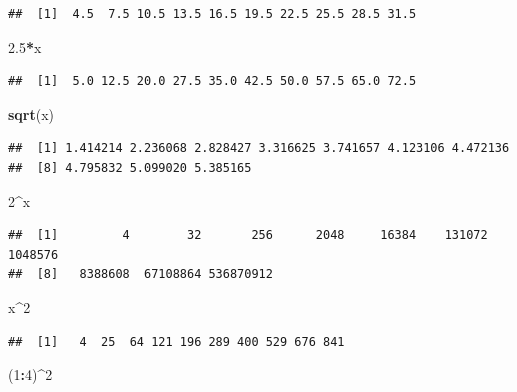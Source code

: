 \documentclass[]{book}
\newenvironment{Shaded}{\begin{snugshade}}{\end{snugshade}}
\newcommand{\DecValTok}[1]{\textcolor[rgb]{0.00,0.00,0.81}{#1}}
\newcommand{\FloatTok}[1]{\textcolor[rgb]{0.00,0.00,0.81}{#1}}
\newcommand{\KeywordTok}[1]{\textcolor[rgb]{0.13,0.29,0.53}{\textbf{#1}}}
\newcommand{\NormalTok}[1]{#1}
\newcommand{\OperatorTok}[1]{\textcolor[rgb]{0.81,0.36,0.00}{\textbf{#1}}}
\theoremstyle{definition}
\theoremstyle{definition}
\theoremstyle{definition}
\theoremstyle{remark}
\begin{document}
\begin{verbatim}
##  [1]  4.5  7.5 10.5 13.5 16.5 19.5 22.5 25.5 28.5 31.5
\end{verbatim}

\begin{Shaded}
\begin{Highlighting}[]
\FloatTok{2.5}\OperatorTok{*}\NormalTok{x}
\end{Highlighting}
\end{Shaded}

\begin{verbatim}
##  [1]  5.0 12.5 20.0 27.5 35.0 42.5 50.0 57.5 65.0 72.5
\end{verbatim}

\begin{Shaded}
\begin{Highlighting}[]
\KeywordTok{sqrt}\NormalTok{(x) }
\end{Highlighting}
\end{Shaded}

\begin{verbatim}
##  [1] 1.414214 2.236068 2.828427 3.316625 3.741657 4.123106 4.472136
##  [8] 4.795832 5.099020 5.385165
\end{verbatim}

\begin{Shaded}
\begin{Highlighting}[]
\DecValTok{2}\OperatorTok{^}\NormalTok{x}
\end{Highlighting}
\end{Shaded}

\begin{verbatim}
##  [1]         4        32       256      2048     16384    131072   1048576
##  [8]   8388608  67108864 536870912
\end{verbatim}

\begin{Shaded}
\begin{Highlighting}[]
\NormalTok{x}\OperatorTok{^}\DecValTok{2}
\end{Highlighting}
\end{Shaded}

\begin{verbatim}
##  [1]   4  25  64 121 196 289 400 529 676 841
\end{verbatim}

\begin{Shaded}
\begin{Highlighting}[]
\NormalTok{(}\DecValTok{1}\OperatorTok{:}\DecValTok{4}\NormalTok{)}\OperatorTok{^}\DecValTok{2}
\end{Highlighting}
\end{Shaded}
\end{document}
